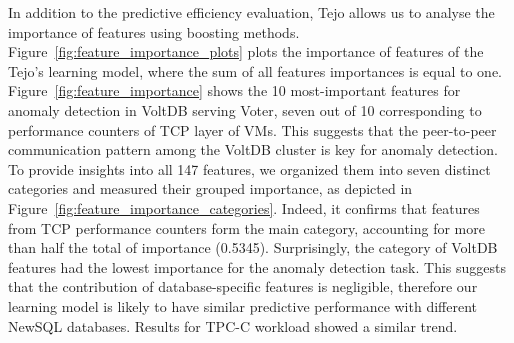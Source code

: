 In addition to the predictive efficiency evaluation, Tejo allows us to analyse the importance of features using boosting methods. Figure~\ref{fig:feature_importance_plots} plots the importance of features of the Tejo's learning model, where the sum of all features importances is equal to one.  Figure~\ref{fig:feature_importance} shows the 10 most-important features for anomaly detection in VoltDB serving Voter, seven out of 10 corresponding to performance counters of TCP layer of VMs. This suggests that the peer-to-peer communication pattern among the VoltDB cluster is key for anomaly detection. To provide insights into all 147 features, we organized them into seven distinct categories and measured their grouped importance, as depicted in Figure~\ref{fig:feature_importance_categories}. Indeed, it confirms that features from TCP performance counters form the main category, accounting for more than half the total of importance (0.5345). Surprisingly, the category of VoltDB features had the lowest importance for the anomaly detection task. This suggests that the contribution of database-specific features is negligible, therefore our learning model is likely to have similar predictive performance with different NewSQL databases. Results for TPC-C workload showed a similar trend.

